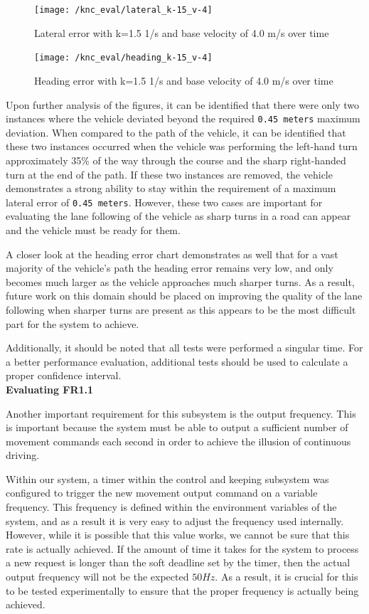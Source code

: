 \documentclass[titlepage, draft]{article}
\begin{document}
{\begin{figure}
	\centering
	\texttt{[image: /knc\_eval/lateral\_k-15\_v-4]}
	\caption{Lateral error with k=1.5 1/s and base velocity of 4.0 m/s over time}
	\label{fig:lateralk10v4}
\end{figure}

\begin{figure}
	\centering
	\texttt{[image: /knc\_eval/heading\_k-15\_v-4]}
	\caption{Heading error with k=1.5 1/s and base velocity of 4.0 m/s over time}
	\label{fig:headingk10v4}
\end{figure}

Upon further analysis of the figures, it can be identified that there were only two instances where the vehicle deviated beyond the required \texttt{0.45 meters} maximum deviation. When compared to the path of the vehicle, it can be identified that these two instances occurred when the vehicle was performing the left-hand turn approximately 35\% of the way through the course and the sharp right-handed turn at the end of the path. If these two instances are removed, the vehicle demonstrates a strong ability to stay within the requirement of a maximum lateral error of \texttt{0.45 meters}. However, these two cases are important for evaluating the lane following of the vehicle as sharp turns in a road can appear and the vehicle must be ready for them.

A closer look at the heading error chart demonstrates as well that for a vast majority of the vehicle's path the heading error remains very low, and only becomes much larger as the vehicle approaches much sharper turns. As a result, future work on this domain should be placed on improving the quality of the lane following when sharper turns are present as this appears to be the most difficult part for the system to achieve.

Additionally, it should be noted that all tests were performed a singular time. For a better performance evaluation, additional tests should be used to calculate a proper confidence interval.\\

\textbf{Evaluating FR1.1}

Another important requirement for this subsystem is the output frequency. This is important because the system must be able to output a sufficient number of movement commands each second in order to achieve the illusion of continuous driving.

Within our system, a timer within the control and keeping subsystem was configured to trigger the new movement output command on a variable frequency. This frequency is defined within the environment variables of the system, and as a result it is very easy to adjust the frequency used internally. However, while it is possible that this value works, we cannot be sure that this rate is actually achieved. If the amount of time it takes for the system to process a new request is longer than the soft deadline set by the timer, then the actual output frequency will not be the expected \(50Hz\). As a result, it is crucial for this to be tested experimentally to ensure that the proper frequency is actually being achieved.

}
\end{document}
